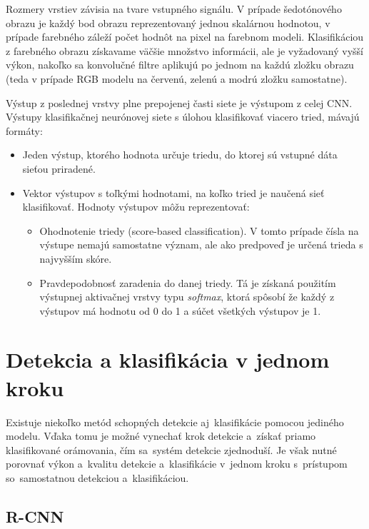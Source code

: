         Rozmery vrstiev závisia na tvare vstupného signálu. V prípade šedotónového obrazu je každý bod obrazu reprezentovaný jednou skalárnou hodnotou, v prípade farebného záleží počet hodnôt na pixel na farebnom modeli. Klasifikáciou z farebného obrazu získavame väčšie množstvo informácii, ale je vyžadovaný vyšší výkon, nakoľko sa konvolučné filtre aplikujú po jednom na každú zložku obrazu (teda v prípade RGB modelu na červenú, zelenú a modrú zložku samostatne).

        Výstup z poslednej vrstvy plne prepojenej časti siete je výstupom z celej \ac{CNN}. Výstupy klasifikačnej neurónovej siete s úlohou klasifikovať viacero tried, mávajú formáty:

        \begin{itemize}
            \item Jeden výstup, ktorého hodnota určuje triedu, do ktorej sú vstupné dáta sieťou priradené.
            \item Vektor výstupov s toľkými hodnotami, na koľko tried je naučená sieť klasifikovať. Hodnoty výstupov môžu reprezentovať:
            \begin{itemize}
                \item Ohodnotenie triedy (score-based classification). V tomto prípade čísla na výstupe nemajú samostatne význam, ale ako predpoveď je určená trieda s najvyšším skóre.
                \item Pravdepodobnosť zaradenia do danej triedy. Tá je získaná použitím výstupnej aktivačnej vrstvy typu \emph{softmax}, ktorá spôsobí že každý z výstupov má hodnotu od 0 do 1 a súčet všetkých výstupov je 1.
            \end{itemize}
        \end{itemize}

\chapter{Detekcia a klasifikácia v jednom kroku}
    Existuje niekoľko metód schopných detekcie aj~klasifikácie pomocou jediného modelu. Vďaka tomu je možné vynechať krok detekcie a~získať priamo klasifikované orámovania, čím sa~systém detekcie zjednoduší. Je však nutné porovnať výkon a~kvalitu detekcie a~klasifikácie v~jednom kroku s~prístupom so~samostatnou detekciou a~klasifikáciou.

    \section{R-CNN}

